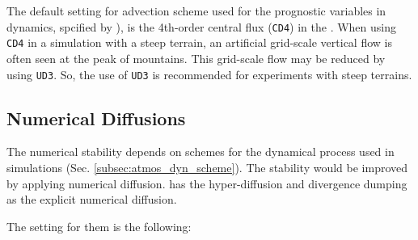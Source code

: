 The default setting for advection scheme used for the prognostic variables in dynamics, spcified by ),
is the 4th-order central flux (\verb|CD4|) in the \scalerm.
When using \verb|CD4| in a simulation with a steep terrain,
an artificial grid-scale vertical flow is often seen at the peak of mountains.
This grid-scale flow may be reduced by using \verb|UD3|.
So, the use of \verb|UD3| is recommended for experiments with steep terrains.


\subsection{Numerical Diffusions} \label{subsec:numdiff}

The numerical stability depends on schemes for the dynamical process used in simulations (Sec. \ref{subsec:atmos_dyn_scheme}).
The stability would be improved by applying numerical diffusion.
\scalerm has the hyper-diffusion and divergence dumping as the explicit numerical diffusion.

The setting for them is the following:

